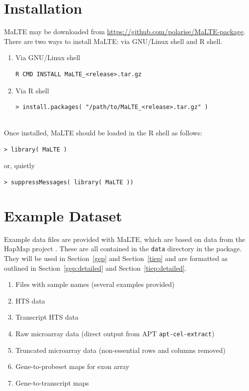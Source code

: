\documentclass[a4paper,12pt]{article}
\begin{document}
\section{Installation}
\label{installation}
\textsf{MaLTE} may be downloaded from \url{https://github.com/polarise/MaLTE-package}. There are two ways to install \textsf{MaLTE}: via GNU/Linux shell and \textsf{R} shell.

\begin{enumerate}
\item Via GNU/Linux shell
\begin{verbatim}
R CMD INSTALL MaLTE_<release>.tar.gz
\end{verbatim}

\item Via \textsf{R} shell
\begin{verbatim}
> install.packages( "/path/to/MaLTE_<release>.tar.gz" )
\end{verbatim}
\end{enumerate}

\noindent\\
Once installed, \textsf{MaLTE} should be loaded in the \textsf{R} shell as follows:
\begin{verbatim}
> library( MaLTE )
\end{verbatim}
or, quietly
\begin{verbatim}
> suppressMessages( library( MaLTE ))
\end{verbatim}

\section{Example Dataset}
\label{datasets}
Example data files are provided with \textsf{MaLTE}, which are based on data from the HapMap project \cite{gibbs2003international}. These are all contained in the \texttt{data} directory in the package. They will be used in Section~\ref{gep} and Section~\ref{tiep} and are formatted as outlined in Section~\ref{gep:detailed} and Section~\ref{tiep:detailed}.

\begin{enumerate}
\item Files with sample names (several examples provided)
\item HTS data
\item Transcript HTS data
\item Raw microarray data (direct output from APT \texttt{apt-cel-extract})
\item Truncated microarray data (non-essential rows and columns removed)
\item Gene-to-probeset maps for exon array
\item Gene-to-transcript maps
\end{enumerate}
\end{document}
